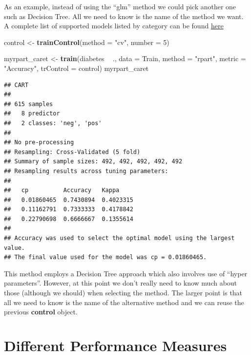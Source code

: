 \documentclass[]{book}
\newenvironment{Shaded}{\begin{snugshade}}{\end{snugshade}}
\newcommand{\KeywordTok}[1]{\textcolor[rgb]{0.13,0.29,0.53}{\textbf{#1}}}
\newcommand{\DataTypeTok}[1]{\textcolor[rgb]{0.13,0.29,0.53}{#1}}
\newcommand{\DecValTok}[1]{\textcolor[rgb]{0.00,0.00,0.81}{#1}}
\newcommand{\StringTok}[1]{\textcolor[rgb]{0.31,0.60,0.02}{#1}}
\newcommand{\OperatorTok}[1]{\textcolor[rgb]{0.81,0.36,0.00}{\textbf{#1}}}
\newcommand{\NormalTok}[1]{#1}
\begin{document}
As an example, instead of using the ``glm'' method we could pick another
one such as Decision Tree. All we need to know is the name of the method
we want. A complete list of supported models listed by category can be
found \href{https://topepo.github.io/caret/available-models.html}{here}

\begin{Shaded}
\begin{Highlighting}[]
\NormalTok{control <-}\StringTok{ }\KeywordTok{trainControl}\NormalTok{(}\DataTypeTok{method =} \StringTok{"cv"}\NormalTok{, }\DataTypeTok{number =} \DecValTok{5}\NormalTok{)}

\NormalTok{myrpart_caret <-}\StringTok{ }\KeywordTok{train}\NormalTok{(diabetes }\OperatorTok{~}\StringTok{ }\NormalTok{.,}
                     \DataTypeTok{data =}\NormalTok{ Train,}
                     \DataTypeTok{method =} \StringTok{"rpart"}\NormalTok{,}
                     \DataTypeTok{metric =} \StringTok{"Accuracy"}\NormalTok{,}
                     \DataTypeTok{trControl =}\NormalTok{ control)}
\NormalTok{myrpart_caret}
\end{Highlighting}
\end{Shaded}

\begin{verbatim}
## CART 
## 
## 615 samples
##   8 predictor
##   2 classes: 'neg', 'pos' 
## 
## No pre-processing
## Resampling: Cross-Validated (5 fold) 
## Summary of sample sizes: 492, 492, 492, 492, 492 
## Resampling results across tuning parameters:
## 
##   cp          Accuracy   Kappa    
##   0.01860465  0.7430894  0.4023315
##   0.11162791  0.7333333  0.4178842
##   0.22790698  0.6666667  0.1355614
## 
## Accuracy was used to select the optimal model using the largest value.
## The final value used for the model was cp = 0.01860465.
\end{verbatim}

This method employs a Decision Tree approach which also involves use of
``hyper parameters''. However, at this point we don't really need to
know much about those (although we should) when selecting the method.
The larger point is that all we need to know is the name of the
alternative method and we can reuse the previous \textbf{control}
object.

\section{Different Performance
Measures}\label{different-performance-measures}
\end{document}
